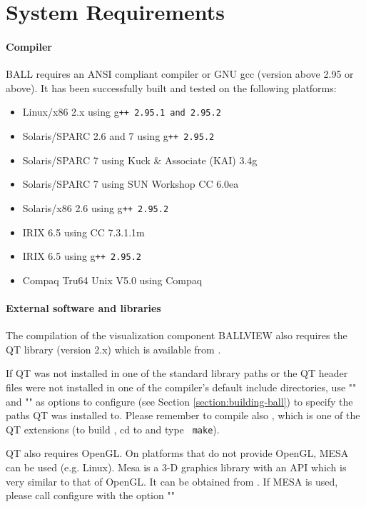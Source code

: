 \section{System Requirements}

\paragraph{Compiler}
  BALL requires an ANSI compliant \CPP compiler or GNU gcc
  (version above 2.95 or above).
  It has been successfully built and tested on the following platforms:
	\begin{itemize}	
   	\item Linux/x86 2.x using g\tt{++} 2.95.1 and 2.95.2
   	\item Solaris/SPARC 2.6 and 7 using g\tt{++} 2.95.2
   	\item Solaris/SPARC 7 using Kuck \& Associate (KAI) \CPP 3.4g
   	\item Solaris/SPARC 7 using SUN Workshop CC 6.0ea
   	\item Solaris/x86 2.6 using g\tt{++} 2.95.2
   	\item IRIX 6.5 using CC 7.3.1.1m
   	\item IRIX 6.5 using g\tt{++} 2.95.2
   	\item Compaq Tru64 Unix V5.0 using Compaq 
 	\end{itemize}

\paragraph{External software and libraries}
The compilation of the visualization component BALLVIEW also requires
the QT library (version 2.x) which is available from
.

If QT was not installed in one of the standard library paths or the
QT header files were not installed in one of the compiler's default
include directories, use "" and
"" as
options to configure (see Section \ref{section:building-ball}) to specify the paths
QT was installed to.
Please remember to compile also , which is one of the QT extensions
(to build , cd to {\tt{}} and type {\tt
make}).

QT also requires OpenGL. On platforms that do not provide OpenGL, MESA can
be used (e.g. Linux). Mesa is a 3-D graphics library with an API which is 
very similar to that of OpenGL. It can be obtained from .
If MESA is used, please call configure with the option ""

